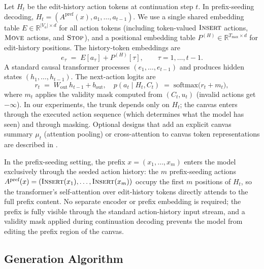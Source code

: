 \documentclass[11pt]{article}
\DeclareRobustCommand{\ph}[1]{#1}
\DeclareRobustCommand{\phA}{A}
\DeclareRobustCommand{\ph}[1]{\ifmmode\text{\phoenicianfont #1}\else{\phoenicianfont #1}\fi}
\DeclareRobustCommand{\phA}{\ph{\char"10900}} %
\DeclareRobustCommand{\ph}[1]{#1}
\DeclareRobustCommand{\phA}{A}
\DeclareRobustCommand{\Stop}{\ifmmode\text{\textsc{Stop}}\else\textsc{Stop}\fi}
\DeclareRobustCommand{\Insert}{\ifmmode\text{\textsc{Insert}}\else\textsc{Insert}\fi}
\DeclareRobustCommand{\Move}{\ifmmode\text{\textsc{Move}}\else\textsc{Move}\fi}
\begin{document}
Let $H_t$ be the edit-history action tokens at continuation step $t$. In prefix-seeding decoding, $H_t=(\phA^{\text{pref}}(x),a_1,\dots,a_{t-1})$. We use a single shared embedding table $E \in \mathbb{R}^{|V_a|\times d}$ for all action tokens (including token-valued $\Insert$ actions, $\Move$ actions, and $\Stop$), and a positional embedding table $P^{(H)} \in \mathbb{R}^{T_{\max}\times d}$ for edit-history positions. The history-token embeddings are
\[
e_\tau \;=\; E[a_\tau] + P^{(H)}[\tau], \qquad \tau=1,\dots,t-1.
\]
A standard causal transformer processes $(e_1,\dots,e_{t-1})$ and produces hidden states $(h_1,\dots,h_{t-1})$. The next-action logits are
\[
r_t \;=\; W_{\text{out}}\, h_{t-1} + b_{\text{out}},
\quad
p(a_t \mid H_t, C_t) \;=\; \mathrm{softmax}\!\big(r_t + m_t\big),
\]
where $m_t$ applies the validity mask computed from $(C_t,u_t)$ (invalid actions get $-\infty$). In our experiments, the trunk depends only on $H_t$; the canvas enters through the executed action sequence (which determines what the model has seen) and through masking. Optional designs that add an explicit canvas summary $\mu_t$ (attention pooling) or cross-attention to canvas token representations are described in .

In the prefix-seeding setting, the prefix $x=(x_1,\dots,x_m)$ enters the model exclusively through the seeded action history: the $m$ prefix-seeding actions $\phA^{\text{pref}}(x) = (\Insert(x_1),\dots,\Insert(x_m))$ occupy the first $m$ positions of $H_t$, so the transformer's self-attention over edit-history tokens directly attends to the full prefix content. No separate encoder or prefix embedding is required; the prefix is fully visible through the standard action-history input stream, and a validity mask applied during continuation decoding prevents the model from editing the prefix region of the canvas.

\subsection{Generation Algorithm}
\label{sec:algo}
\end{document}
